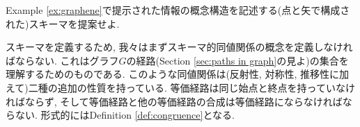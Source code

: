 \begin{exercise}\label{exc:schema for first tables}
Example \ref{ex:graphene}で提示された情報の概念構造を記述する(点と矢で構成された)スキーマを提案せよ.
\end{exercise}


スキーマを定義するため, 我々はまずスキーマ的同値関係の概念を定義しなければならない. これはグラフ$G$の経路(Section \ref{sec:paths in graph}の見よ)の集合を理解するためのものである. このような同値関係は(反射性, 対称性, 推移性に加えて)二種の追加の性質を持っている. 等価経路は同じ始点と終点を持っていなければならず, そして等価経路と他の等価経路の合成は等価経路にならなければならない. 形式的にはDefinition \ref{def:congruence}となる. 

